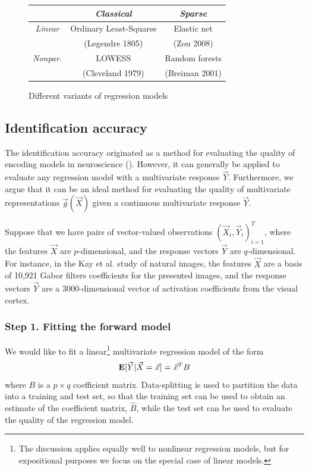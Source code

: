 \begin{figure}
\centering
\begin{tabular}{c|c|c|}
 & \emph{Classical} & \emph{Sparse} \\ \hline
 \emph{Linear} & Ordinary Least-Squares  & Elastic net \\ 
  & (Legendre 1805) & (Zou 2008)  \\\hline
 \emph{Nonpar.} & LOWESS  & Random forests  \\ 
   & (Cleveland 1979) & (Breiman 2001)  \\\hline
\end{tabular}
\caption{Different variants of regression models}
\label{tab:regression}
\end{figure}

\subsection{Identification accuracy}\label{sec:ident_risk}

The identification accuracy originated as a method for evaluating the
quality of encoding models in neuroscience (\cite{Kay2008a}).
However, it can generally be applied to evaluate any regression model
with a multivariate response $\vec{Y}$.  Furthermore, we argue that it
can be an ideal method for evaluating the quality of multivariate
representations $\vec{g}(\vec{X})$ given a continuous multivariate
response $\vec{Y}$.

Suppose that we have pairs of vector-valued observations $(\vec{X}_i,
\vec{Y}_i)_{i=1}^T$, where the features $\vec{X}$ are $p$-dimensional,
and the response vectors $\vec{Y}$ are $q$-dimensional.  For instance,
in the Kay et al. study of natural images, the features $\vec{X}$ are
a basis of 10,921 Gabor filters coefficients for the presented images,
and the response vectors $\vec{Y}$ are a 3000-dimensional vector of
activation coefficients from the visual cortex.

\subsubsection{Step 1. Fitting the forward model}

We would like to fit a linear\footnote{The discussion applies equally
  well to nonlinear regression models, but for expositional purposes
  we focus on the special case of linear models.} multivariate
regression model of the form
\[
\textbf{E}[\vec{Y}|\vec{X} = \vec{x}] = \vec{x}^T B
\]
where $B$ is a $p \times q$ coefficient matrix.  Data-splitting is
used to partition the data into a training and test set, so that the
training set can be used to obtain an estimate of the coefficient
matrix, $\hat{B}$, while the test set can be used to evaluate the
quality of the regression model.

